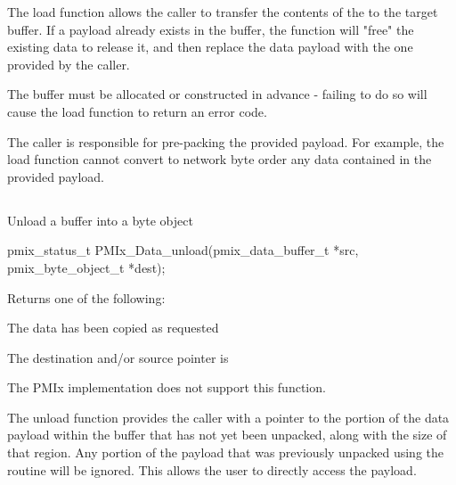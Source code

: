 \descr

The load function allows the caller to transfer the contents of the 
 to the  target buffer. If a payload
already exists in the buffer, the function will "free" the existing data to
release it, and then replace the data payload with the one provided
by the caller.

\adviceuserstart
The buffer must be allocated or constructed in advance - failing to do so
will cause the load function to return an error code.

The caller is responsible for pre-packing the provided
payload. For example, the load function cannot convert to network byte order
any data contained in the provided payload.
\adviceuserend

\subsection{}

\summary

Unload a buffer into a byte object

\format

\cspecificstart
\begin{codepar}
pmix_status_t
PMIx_Data_unload(pmix_data_buffer_t *src,
                 pmix_byte_object_t *dest);
\end{codepar}
\cspecificend

\begin{arglist}
\end{arglist}

Returns one of the following:
\begin{constantdesc}
\item {} The data has been copied as requested
\item {} The destination and/or source pointer is 
\item {} The \ac{PMIx} implementation does not support this function.
\end{constantdesc}

\descr

The unload function provides the caller with a pointer to the
portion of the data payload within the buffer that has not yet been
unpacked, along with the size of that region. Any portion of
the payload that was previously unpacked using the 
routine will be ignored. This allows the user to directly access the payload.

